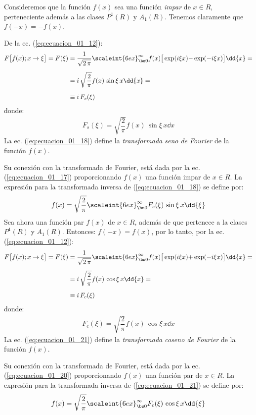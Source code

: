Consideremos que la función $f (x)$ sea una función \emph{impar} de $x \in R$, perteneciente además a las clases $P^{1} (R)$ y $A_{1} (R)$. Tenemos claramente que $f(-x) = - f (x)$. 
\par
De la ec. (\ref{eq:ecuacion_01_12}):
\begin{align}
\begin{aligned}[b]
F \big[ f (x); x \to \xi \big] = F (\xi) &= \dfrac{1}{\sqrt{2 \, \pi}} \scaleint{6ex}_{\bs 0}^{\infty} f (x) \big[ \exp(i \xi x) {-} \exp(-i \xi x) \big] \dd{x} = \\[0.5em]
&= i \, \sqrt{\dfrac{2}{\pi}} f (x) \, \sin \xi \, x \dd{x} = \\[0.5em]
&\equiv i \, F_{s} (\xi)
\end{aligned}
\label{eq:ecuacion_01_17}
\end{align}
donde:
\begin{align}
F_{s} (\xi) = \sqrt{\dfrac{2}{\pi}} f (x) \, \sin \xi \, x \dd{x}
\label{eq:ecuacion_01_18}
\end{align}
La ec. (\ref{eq:ecuacion_01_18}) define la \emph{transformada seno de Fourier} de la función $f (x)$.
\par
Su conexión con la transformada de Fourier, está dada por la ec. (\ref{eq:ecuacion_01_17}) proporcionando $f (x)$ una función impar de $x \in R$. La expresión para la transformada inversa de (\ref{eq:ecuacion_01_18}) se define por:
\begin{align}
f (x) = \sqrt{\dfrac{2}{\pi}} \scaleint{6ex}_{\bs 0}^{\infty} F_{s}(\xi) \, \sin \xi \, x \dd{\xi}
\label{eq:ecuacion_01_19}
\end{align}
Sea ahora una función par $f (x)$ de $x \in R$, además de que pertenece a la clases $P^{1}(R)$ y $A_{1}(R)$. Entonces: $f(-x) = f (x)$, por lo tanto, por la ec. (\ref{eq:ecuacion_01_12}):
\begin{align}
\begin{aligned}[b]
F \big[ f (x); x \to \xi \big] = F (\xi) &= \dfrac{1}{\sqrt{2 \, \pi}} \scaleint{6ex}_{\bs 0}^{\infty} f (x) \big[ \exp(i \xi x) {+} \exp(-i \xi x) \big] \dd{x} = \\[0.5em]
&= i \, \sqrt{\dfrac{2}{\pi}} f (x) \, \cos \xi \, x \dd{x} = \\[0.5em]
&\equiv i \, F_{c} (\xi)    
\end{aligned}
\label{eq:ecuacion_01_20}
\end{align}
donde:
\begin{align}
F_{c} (\xi) = \sqrt{\dfrac{2}{\pi}} f (x) \, \cos \xi \, x \dd{x}
\label{eq:ecuacion_01_21}
\end{align}
La ec. (\ref{eq:ecuacion_01_21}) define la \emph{transformada coseno de Fourier} de la función $f (x)$.
\par
Su conexión con la transformada de Fourier, está dada por la ec. (\ref{eq:ecuacion_01_20}) proporcionando $f (x)$ una función par de $x \in R$. La expresión para la transformada inversa de (\ref{eq:ecuacion_01_21}) se define por:
\begin{align}
f (x) = \sqrt{\dfrac{2}{\pi}} \scaleint{6ex}_{\bs 0}^{\infty} F_{c}(\xi) \, \cos \xi \, x \dd{\xi}
\label{eq:ecuacion_01_22}
\end{align}

